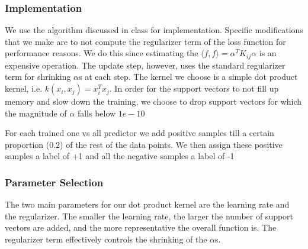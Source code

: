 \documentclass[10pt,a4paper]{article}
\begin{document}
\subsubsection{Implementation}
We use the algorithm discussed in class for implementation. Specific modifications that we make are to not compute the regularizer term of the loss function for performance reasons. We do this since estimating the $\langle f, f \rangle = \alpha^T K_{ij} \alpha$ is an expensive operation. The update step, however, uses the standard regularizer term for shrinking $\alpha$s at each step. The kernel we choose is a simple dot product kernel, i.e. $k(x_i, x_j) = x_i^T x_j$. In order for the support vectors to not fill up memory and slow down the training, we choose to drop support vectors for which the magnitude of $\alpha$ falls below $1e-10$

For each trained one vs all predictor we add positive samples till a certain proportion ($0.2$) of the rest of the data points. We then assign these positive samples a label of +1 and all the negative samples a label of -1
\subsubsection{Parameter Selection}
The two main parameters for our dot product kernel are the learning rate and the regularizer. The smaller the learning rate, the larger the number of support vectors are added, and the more representative the overall function is. The regularizer term effectively controls the shrinking of the $\alpha$s. 
\end{document}
